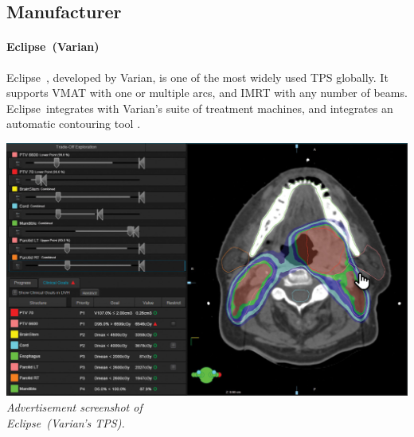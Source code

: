 \subsection{Manufacturer}
\paragraph{Eclipse\texttrademark\ (Varian)}
\begin{multicols}{2}
	Eclipse\texttrademark\ \cite{eclipse}, developed by Varian, is one of the most widely used TPS globally.
	It supports VMAT with one or multiple arcs, and IMRT with any number of beams.
	Eclipse\texttrademark\ integrates with Varian's suite of treatment machines, and integrates an automatic contouring tool \cite{eclipse_brochure}.
	
	\columnbreak
	
	\centering
	\includegraphics[width=\linewidth]{EclipseVarian.png}
	\textit{Advertisement screenshot of \\ Eclipse\texttrademark\ (Varian's TPS).}
\end{multicols}

